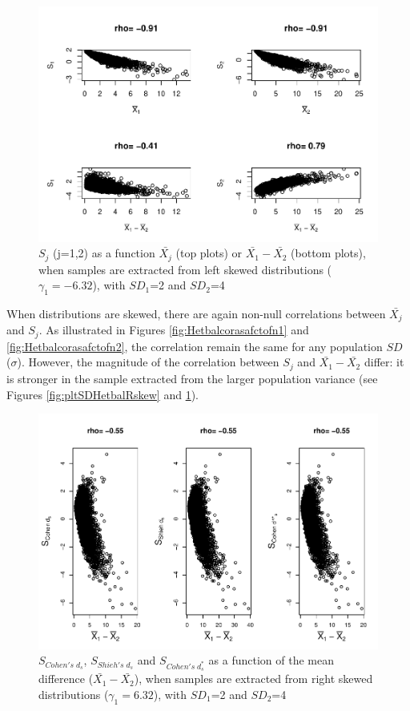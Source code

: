 \documentclass[
  english,
  man]{apa6}
\begin{document}
\begin{figure}
\centering
\includegraphics{Correlation_files/figure-latex/pltSDHetbalLskew-1.pdf}
\caption{\label{fig:pltSDHetbalLskew}\(S_j\) (j=1,2) as a function \(\bar{X_j}\) (top plots) or \(\bar{X_1}-\bar{X_2}\) (bottom plots), when samples are extracted from left skewed distributions (\(\gamma_1 = -6.32\)), with \(SD_1\)=2 and \(SD_2\)=4}
\end{figure}

When distributions are skewed, there are again non-null correlations between \(\bar{X_j}\) and \(S_j\). As illustrated in Figures \ref{fig:Hetbalcorasafctofn1} and \ref{fig:Hetbalcorasafctofn2}, the correlation remain the same for any population \(SD\) (\(\sigma\)). However, the magnitude of the correlation between \(S_j\) and \(\bar{X_1}-\bar{X_2}\) differ: it is stronger in the sample extracted from the larger population variance (see Figures \ref{fig:pltSDHetbalRskew} and \ref{fig:pltSDHetbalLskew}).

\begin{figure}
\centering
\includegraphics{Correlation_files/figure-latex/pltStdzrHetbalRskew-1.pdf}
\caption{\label{fig:pltStdzrHetbalRskew}\(S_{Cohen's \; d_s}\), \(S_{Shieh's \; d_s}\) and \(S_{Cohen's \; d^*_s}\) as a function of the mean difference (\(\bar{X_1}-\bar{X_2}\)), when samples are extracted from right skewed distributions (\(\gamma_1 = 6.32\)), with \(SD_1\)=2 and \(SD_2\)=4}
\end{figure}
\end{document}
